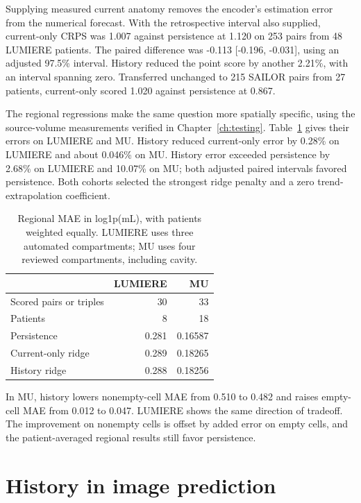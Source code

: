 Supplying measured current anatomy removes the encoder's estimation error from the numerical forecast. With the retrospective interval also supplied, current-only CRPS was 1.007 against persistence at 1.120 on 253 pairs from 48 LUMIERE patients. The paired difference was -0.113 [-0.196, -0.031], using an adjusted 97.5\% interval. History reduced the point score by another 2.21\%, with an interval spanning zero. Transferred unchanged to 215 SAILOR pairs from 27 patients, current-only scored 1.020 against persistence at 0.867.

The regional regressions make the same question more spatially specific, using the source-volume measurements verified in Chapter~\ref{ch:testing}. Table~\ref{tab:regional} gives their errors on LUMIERE and MU. History reduced current-only error by 0.28\% on LUMIERE and about 0.046\% on MU. History error exceeded persistence by 2.68\% on LUMIERE and 10.07\% on MU; both adjusted paired intervals favored persistence. Both cohorts selected the strongest ridge penalty and a zero trend-extrapolation coefficient.

\begin{table}[htbp]\centering\small
\caption[Corrected regional-volume forecasts]{Regional MAE in log1p(mL), with patients weighted equally. LUMIERE uses three automated compartments; MU uses four reviewed compartments, including cavity.}\label{tab:regional}
\begin{tabular}{lrr}\toprule
 & LUMIERE & MU\\\midrule
Scored pairs or triples & 30 & 33\\
Patients & 8 & 18\\
Persistence & 0.281 & 0.16587\\
Current-only ridge & 0.289 & 0.18265\\
History ridge & 0.288 & 0.18256\\\bottomrule
\end{tabular}
\end{table}
\FloatBarrier

In MU, history lowers nonempty-cell MAE from 0.510 to 0.482 and raises empty-cell MAE from 0.012 to 0.047. LUMIERE shows the same direction of tradeoff. The improvement on nonempty cells is offset by added error on empty cells, and the patient-averaged regional results still favor persistence.

\section{History in image prediction}

